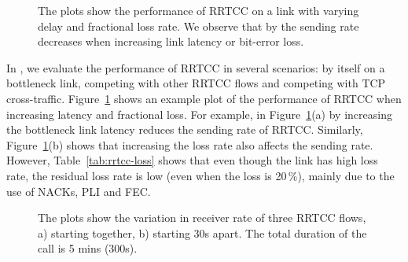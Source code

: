 \begin{figure}[!t]
  \centerline{
   }
   \centerline{
  }
  \caption{The plots show the performance of RRTCC on a link with varying
  delay and fractional loss rate. We observe that by the sending rate
  decreases when increasing link latency or bit-error loss. }
  \label{fig:rrtcc-single}
\end{figure}

\begin{table}[!t]
\begin{center}{
  }
\end{center}
\caption{RRTCC: Metrics for a bottleneck with different packet loss rates.}
\label{tab:rrtcc-loss}
\end{table}

In , we evaluate the performance of RRTCC in several
scenarios: by itself on a bottleneck link, competing with other RRTCC flows
and competing with TCP cross-traffic. Figure~\ref{fig:rrtcc-single} shows an
example plot of the performance of RRTCC when increasing latency and
fractional loss. For example, in Figure~\ref{fig:rrtcc-single}(a) by
increasing the bottleneck link latency reduces the sending rate of RRTCC.
Similarly, Figure~\ref{fig:rrtcc-single}(b) shows that increasing the loss
rate also affects the sending rate. However, Table~\ref{tab:rrtcc-loss} shows
that even though the link has high loss rate, the residual loss rate is low
(even when the loss is 20\,\%), mainly due to the use of NACKs, PLI and FEC.


\begin{figure}[!t]
\centerline{
  }
  \centerline{
  }
   \caption{The plots show the variation in receiver rate of three RRTCC
   flows, a) starting together, b) starting 30s apart. The total duration of
   the call is 5 mins (300s).}
\label{fig:rrtcc-self-fair}
\end{figure}

